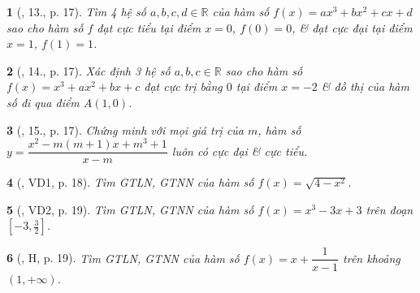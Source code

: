 \documentclass{article}
\newtheorem{baitoan}{}
\begin{document}
\begin{baitoan}[\cite{SGK_Toan_12_giai_tich_nang_cao}, 13., p. 17]
	Tìm 4 hệ số $a,b,c,d\in\mathbb{R}$ của hàm số $f(x) = ax^3 + bx^2 + cx + d$ sao cho hàm số $f$ đạt cực tiểu tại điểm $x = 0$, $f(0) = 0$, \& đạt cực đại tại điểm $x = 1$, $f(1) = 1$.
\end{baitoan}

\begin{baitoan}[\cite{SGK_Toan_12_giai_tich_nang_cao}, 14., p. 17]
	Xác định 3 hệ số $a,b,c\in\mathbb{R}$ sao cho hàm số $f(x) = x^3 + ax^2 + bx + c$ đạt cực trị bằng $0$ tại điểm $x = -2$ \& đồ thị của hàm số đi qua điểm $A(1,0)$.
\end{baitoan}

\begin{baitoan}[\cite{SGK_Toan_12_giai_tich_nang_cao}, 15., p. 17]
	Chứng minh với mọi giá trị của $m$, hàm số $y = \dfrac{x^2 - m(m + 1)x + m^3 + 1}{x - m}$ luôn có cực đại \& cực tiểu.
\end{baitoan}

\begin{baitoan}[\cite{SGK_Toan_12_giai_tich_nang_cao}, VD1, p. 18]
	Tìm {\rm GTLN, GTNN} của hàm số $f(x) = \sqrt{4 - x^2}$.
\end{baitoan}

\begin{baitoan}[\cite{SGK_Toan_12_giai_tich_nang_cao}, VD2, p. 19]
	Tìm {\rm GTLN, GTNN} của hàm số $f(x) = x^3 - 3x + 3$ trên đoạn $\left[-3,\frac{3}{2}\right]$.
\end{baitoan}

\begin{baitoan}[\cite{SGK_Toan_12_giai_tich_nang_cao}, H, p. 19]
	Tìm {\rm GTLN, GTNN} của hàm số $f(x) = x + \dfrac{1}{x - 1}$ trên khoảng $(1,+\infty)$.
\end{baitoan}
\end{document}
